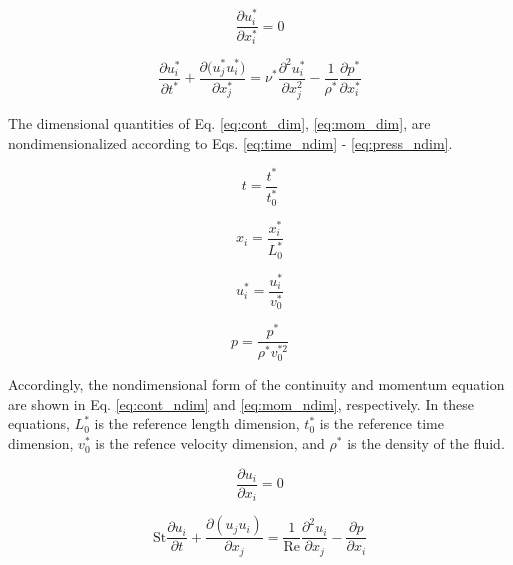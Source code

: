 \documentclass[10pt, letterpaper]{article}
\begin{document}
\begin{equation}
  \frac{\partial{u_{i}^{*}}}{\partial{x_{i}^{*}}} = 0
  \label{eq:cont_dim}
\end{equation}

\begin{equation}
  \frac{\partial{u_{i}^{*}}}{\partial{t^{*}}} + \frac{\partial{(u_{j}^{*}}u_{i}^{*})}{\partial{x_{j}^{*}}} ={\nu^{*}}\frac{\partial^{2}{u_{i}^{*}}}{\partial{x_{j}^{2}}} - \frac{1}{\rho^{*}}\frac{\partial{p^{*}}}{\partial{x_{i}^{*}}}
  \label{eq:mom_dim}
\end{equation}

The dimensional quantities of Eq. \ref{eq:cont_dim}, \ref{eq:mom_dim}, are nondimensionalized according to Eqs. \ref{eq:time_ndim} - \ref{eq:press_ndim}.

\begin{equation}
  t = \frac{t^{*}}{t_{0}^{*}}
  \label{eq:time_ndim}
\end{equation}


\begin{equation}
  x_{i} = \frac{x_{i}^{*}}{L_{0}^{*}}
  \label{eq:dist_ndim}
\end{equation}


\begin{equation}
  u_{i}^{*} = \frac{u_{i}^{*}}{v_{0}^{*}}
  \label{eq:vel_ndim}
\end{equation}


\begin{equation}
  p = \frac{p^{*}}{\rho^{*}v_{0}^{*2}}
  \label{eq:press_ndim}
\end{equation}

Accordingly, the nondimensional form of the continuity and momentum equation are shown in Eq. \ref{eq:cont_ndim} and \ref{eq:mom_ndim}, respectively. In these equations, $L_{0}^{*}$ is the reference length dimension, $t_{0}^{*}$ is the reference time dimension, $v_{0}^{*}$ is the refence velocity dimension, and $\rho^{*}$ is the density of the fluid.

\begin{equation}
  \frac{\partial{u_{i}}}{\partial{x_{i}}} = 0
  \label{eq:cont_ndim}
\end{equation}

\begin{equation}
  \boxed{
  \text{St}\frac{\partial{u_{i}}}{\partial{t}} + \frac{\partial{(u_{j}u_{i})}}{\partial{x_{j}}} =\frac{1}{\text{Re}}\frac{\partial^{2}{u_{i}}}{\partial{x_{j}}} - \frac{\partial{p}}{\partial{x_{i}}}
  \label{eq:mom_ndim}
  }
\end{equation}
\end{document}

